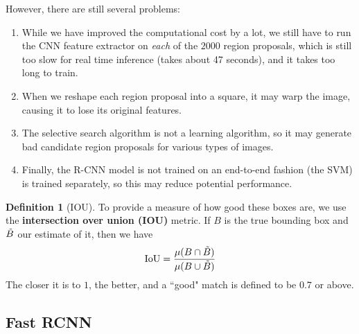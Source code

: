 \documentclass{article}
\theoremstyle{definition}
\theoremstyle{remark}
\theoremstyle{definition}
\newtheorem{definition}{Definition}[section]
\begin{document}
    However, there are still several problems: 
    \begin{enumerate}
        \item While we have improved the computational cost by a lot, we still have to run the CNN feature extractor on \textit{each} of the $2000$ region proposals, which is still too slow for real time inference (takes about 47 seconds), and it takes too long to train. 
        \item When we reshape each region proposal into a square, it may warp the image, causing it to lose its original features. 
        \item The selective search algorithm is not a learning algorithm, so it may generate bad candidate region proposals for various types of images.  
        \item Finally, the R-CNN model is not trained on an end-to-end fashion (the SVM) is trained separately, so this may reduce potential performance. 
    \end{enumerate} 

    \begin{definition}[IOU]
    To provide a measure of how good these boxes are, we use the \textbf{intersection over union (IOU)} metric. If $B$ is the true bounding box and $\Tilde{B}$ our estimate of it, then we have 
    \[\mathrm{IoU} = \frac{\mu(B \cap \Tilde{B})}{\mu(B \cup \Tilde{B})}\]
    The closer it is to $1$, the better, and a ``good" match is defined to be $0.7$ or above.  
    \end{definition} 

  \subsection{Fast RCNN}
\end{document}
